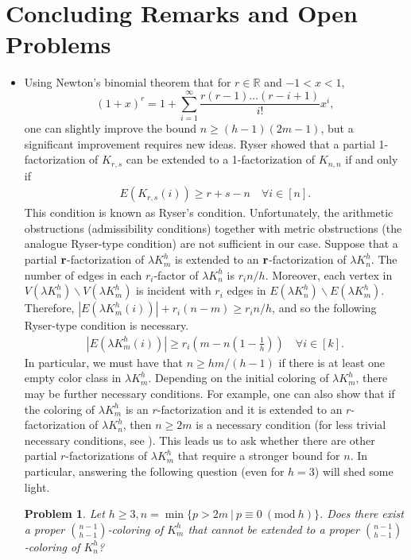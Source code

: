 \documentclass[12pt,oneside]{amsart}
\newtheorem{question}[theorem]{Problem}
\newcommand{\Mod}[1]{\ (\mathrm{mod}\ #1)}
\begin{document}
\section{Concluding Remarks and Open Problems}
\begin{itemize}
    \item Using Newton's binomial theorem that for $r\in\mathbb R$ and $-1<x<1$, $$(1+x)^{r}=1+\sum_{i=1}^\infty \frac{r(r-1)\dots(r-i+1)}{i!}x^i,$$
one can slightly improve the bound $n\geq (h-1)(2m-1)$, but a significant improvement requires new ideas. Ryser \cite{MR42361} showed  that a partial 1-factorization of $K_{r,s}$ can be extended to a 1-factorization of $K_{n,n}$ if and only if 
\begin{align} \label{Ryserorigcond}
    E(K_{r,s}(i))\geq r+s-n \quad \forall i\in [n].
\end{align}
This condition is known as Ryser's condition. Unfortunately, the arithmetic obstructions (admissibility conditions) together with metric obstructions (the analogue Ryser-type condition) are not sufficient in our case. Suppose that a partial $\vb r$-factorization of $\lambda K_m^h$ is extended to an $\vb r$-factorization of $\lambda K_n^h$. The number of edges in each $r_i$-factor of $\lambda K_n^h$ is $r_i n/h$. Moreover, each vertex in $V(\lambda K_n^h)\backslash V(\lambda K_m^h)$ is incident with $r_i$ edges in $E(\lambda K_n^h)\backslash E(\lambda K_m^h)$. Therefore, $|E(\lambda K_m^h(i) )|+r_i(n-m)\geq r_i n /h$, and so the following Ryser-type condition is necessary. 
\begin{align} \label{rysergencond}
    |E(\lambda K_m^h(i) )| \geq r_i\left(m- n(1-\frac{1}{h})   \right) \quad \forall i\in [k].
\end{align}
In particular, we must have that $n\geq hm/(h-1)$ if there is at least one empty color class in $\lambda K_m^h$.  Depending on the initial coloring of $\lambda K_m^h$, there may be further necessary conditions. For example, one can also show that if the  coloring  of $\lambda K_m^h$ is an $r$-factorization and it is extended to an $r$-factorization of $\lambda K_n^h$, then $n\geq 2m$ is a necessary condition \cite{MR3910877} (for less trivial necessary conditions, see \cite{bahsadeurjc2021}). This leads us  to ask whether there are other partial $r$-factorizations of $\lambda K_m^h$ that require a stronger bound for $n$. In particular, answering the following question (even for $h=3$) will shed some light.
\begin{question}
Let $h\geq 3, n= \min \{ p > 2m \ |\  p \equiv 0 \Mod h  \}$. Does there exist a proper $\binom{n-1}{h-1}$-coloring of $K_m^h$ that cannot be extended to a proper $\binom{n-1}{h-1}$-coloring of $K_n^h$?
\end{question}





\end{itemize}
\end{document}
